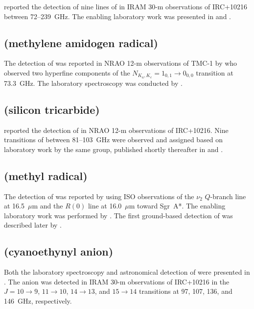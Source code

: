 \documentclass[twocolumn]{aastex631}
\begin{document}
	\citet{Guelin:1991uy} reported the detection of nine lines of  in IRAM 30-m observations of IRC+10216 between 72--239~GHz.  The enabling laboratory work was presented in \citet{Saito:1984ju} and \citet{Brown:1990gh}.
	
	\subsection{ (methylene amidogen radical)}
	\label{H2CN}
	
	The detection of  was reported in NRAO 12-m observations of TMC-1 by \citet{Ohishi:1994hk} who observed two hyperfine components of the $N_{K_a,K_c} = 1_{0,1}\rightarrow0_{0,0}$ transition at 73.3~GHz.  The laboratory spectroscopy was conducted by \citet{Yamamoto:1992fx}.
	
	\subsection{ (silicon tricarbide)}
	\label{SiC3}
	
	\citet{Apponi:1999jd} reported the detection of  in NRAO 12-m observations of IRC+10216.  Nine transitions of  between 81--103~GHz were observed and assigned based on laboratory work by the same group, published shortly thereafter in \citet{McCarthy:1999fs} and \citet{Apponi:1999iz}.
	
	\subsection{ (methyl radical)}
	\label{CH3}
	
	The detection of  was reported by \citet{Feuchtgruber:2000hh} using ISO observations of the $\nu_2$ $Q$-branch line at 16.5~$\mu$m and the $R(0)$ line at 16.0~$\mu$m toward Sgr~A*.  The enabling laboratory work was performed by \citet{Yamada:1981dk}.  The first ground-based detection of  was described later by \citet{Knez:2009gp}.
	
	\subsection{ (cyanoethynyl anion)}
	\label{C3N-}
	
	Both the laboratory spectroscopy and astronomical detection of  were presented in \citet{Thaddeus:2008ux}.  The anion was detected in IRAM 30-m observations of IRC+10216 in the $J = 10\rightarrow9$, $11\rightarrow10$, $14\rightarrow13$, and $15\rightarrow14$ transitions at 97, 107, 136, and 146~GHz, respectively.
	
\end{document}
